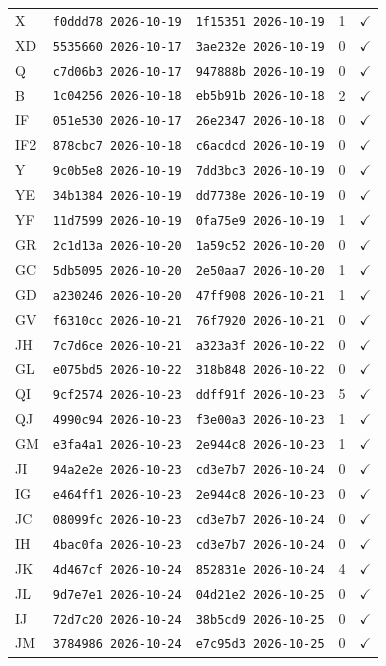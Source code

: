 \begin{tabular}{llllc}
X & \texttt{f0ddd78 2026-10-19} & \texttt{1f15351 2026-10-19} & 1 & $\checkmark$ \\
XD & \texttt{5535660 2026-10-17} & \texttt{3ae232e 2026-10-19} & 0 & $\checkmark$ \\
Q & \texttt{c7d06b3 2026-10-17} & \texttt{947888b 2026-10-19} & 0 & $\checkmark$ \\
B & \texttt{1c04256 2026-10-18} & \texttt{eb5b91b 2026-10-18} & 2 & $\checkmark$ \\
IF & \texttt{051e530 2026-10-17} & \texttt{26e2347 2026-10-18} & 0 & $\checkmark$ \\
IF2 & \texttt{878cbc7 2026-10-18} & \texttt{c6acdcd 2026-10-19} & 0 & $\checkmark$ \\
Y & \texttt{9c0b5e8 2026-10-19} & \texttt{7dd3bc3 2026-10-19} & 0 & $\checkmark$ \\
YE & \texttt{34b1384 2026-10-19} & \texttt{dd7738e 2026-10-19} & 0 & $\checkmark$ \\
YF & \texttt{11d7599 2026-10-19} & \texttt{0fa75e9 2026-10-19} & 1 & $\checkmark$ \\
GR & \texttt{2c1d13a 2026-10-20} & \texttt{1a59c52 2026-10-20} & 0 & $\checkmark$ \\
GC & \texttt{5db5095 2026-10-20} & \texttt{2e50aa7 2026-10-20} & 1 & $\checkmark$ \\
GD & \texttt{a230246 2026-10-20} & \texttt{47ff908 2026-10-21} & 1 & $\checkmark$ \\
GV & \texttt{f6310cc 2026-10-21} & \texttt{76f7920 2026-10-21} & 0 & $\checkmark$ \\
JH & \texttt{7c7d6ce 2026-10-21} & \texttt{a323a3f 2026-10-22} & 0 & $\checkmark$ \\
GL & \texttt{e075bd5 2026-10-22} & \texttt{318b848 2026-10-22} & 0 & $\checkmark$ \\
QI & \texttt{9cf2574 2026-10-23} & \texttt{ddff91f 2026-10-23} & 5 & $\checkmark$ \\
QJ & \texttt{4990c94 2026-10-23} & \texttt{f3e00a3 2026-10-23} & 1 & $\checkmark$ \\
GM & \texttt{e3fa4a1 2026-10-23} & \texttt{2e944c8 2026-10-23} & 1 & $\checkmark$ \\
JI & \texttt{94a2e2e 2026-10-23} & \texttt{cd3e7b7 2026-10-24} & 0 & $\checkmark$ \\
IG & \texttt{e464ff1 2026-10-23} & \texttt{2e944c8 2026-10-23} & 0 & $\checkmark$ \\
JC & \texttt{08099fc 2026-10-23} & \texttt{cd3e7b7 2026-10-24} & 0 & $\checkmark$ \\
IH & \texttt{4bac0fa 2026-10-23} & \texttt{cd3e7b7 2026-10-24} & 0 & $\checkmark$ \\
JK & \texttt{4d467cf 2026-10-24} & \texttt{852831e 2026-10-24} & 4 & $\checkmark$ \\
JL & \texttt{9d7e7e1 2026-10-24} & \texttt{04d21e2 2026-10-25} & 0 & $\checkmark$ \\
IJ & \texttt{72d7c20 2026-10-24} & \texttt{38b5cd9 2026-10-25} & 0 & $\checkmark$ \\
JM & \texttt{3784986 2026-10-24} & \texttt{e7c95d3 2026-10-25} & 0 & $\checkmark$ \\
\bottomrule
\end{tabular}
